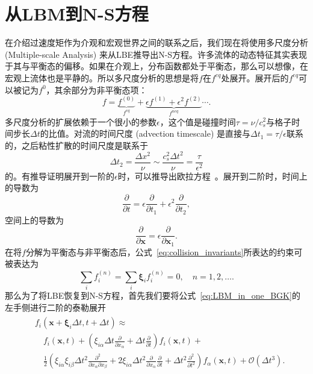 \section{从LBM到N-S方程}
在介绍过速度矩作为介观和宏观世界之间的联系之后，我们现在将使用多尺度分析 (Multiple-scale Analysis) 来从LBE推导出N-S方程。许多流体的动态特征其实表现于其与平衡态的偏移。如果在介观上，分布函数都处于平衡态，那么可以想像，在宏观上流体也是平静的。所以多尺度分析的思想是将$f$在$f^{eq}$处展开。展开后的$f^{eq}$可以被记为$f^{0}$，其余部分为非平衡态项：
\begin{equation}
    f=\underbrace{f^{(0)}}_{f^{e q}}+\underbrace{\epsilon f^{(1)}+\epsilon^2 f^{(2)}}_{f^{n e q}} \cdots .
\end{equation}
多尺度分析的扩展依赖于一个很小的参数$\epsilon$，这个值是碰撞时间$\tau=\nu/c_s^2$与格子时间步长$\Delta t$的比值。对流的时间尺度 (advection timescale) 是直接与$\Delta t_1=\tau/\epsilon$联系的，之后粘性扩散的时间尺度是联系于
\begin{equation}
    \Delta t_2=\frac{\Delta x^2}{\nu} \sim \frac{c_s^2 \Delta t^2}{\nu}=\frac{\tau}{\epsilon^2}
\end{equation}
的。有推导证明展开到一阶的$\epsilon$时，可以推导出欧拉方程~\cite{huang2008statistical}。展开到二阶时，时间上的导数为
\begin{equation}
    \frac{\partial}{\partial t}=\epsilon \frac{\partial}{\partial t_1}+\epsilon^2 \frac{\partial}{\partial t_2},
    \label{eq:ms_t}
\end{equation}
空间上的导数为
\begin{equation}
    \frac{\partial}{\partial \boldsymbol{x}}=\epsilon \frac{\partial}{\partial \boldsymbol{x}_1}.
    \label{eq:ms_x}
\end{equation}
在将$f$分解为平衡态与非平衡态后，公式~\ref{eq:collision_invariants}所表达的约束可被表达为
\begin{equation}
    \sum_{i} f_{i}^{(n)}=\sum_{i} \boldsymbol{\xi}_{i} f_{i}^{(n)}=0, \quad  n=1,2, \ldots.
\end{equation}
那么为了将LBE恢复到N-S方程，首先我们要将公式~\ref{eq:LBM_in_one_BGK}的左手侧进行二阶的泰勒展开
\begin{align}
    \begin{split}
        & f_{i}\left(\boldsymbol{x}+\boldsymbol{\xi}_{i} \Delta t, t+\Delta t\right) \approx \\
        & \quad f_{i}(\boldsymbol{x}, t)+\left(\xi_{i \alpha} \Delta t \frac{\partial}{\partial x_{\alpha}}+\Delta t \frac{\partial}{\partial t}\right) f_{i}(\boldsymbol{x}, t)+ \\
        & \quad \frac{1}{2}\left(\xi_{i \alpha} \xi_{i \beta} \Delta t^{2} \frac{\partial^{2}}{\partial x_{\alpha} \partial x_{\beta}}+2 \xi_{i \alpha} \Delta t^{2} \frac{\partial}{\partial x_{\alpha}} \frac{\partial}{\partial t}+\Delta t^{2} \frac{\partial^{2}}{\partial t^{2}}\right) f_{\alpha}(\boldsymbol{x}, t)+\mathcal{O}\left(\Delta t^{3}\right) .
    \end{split}
\end{align}
